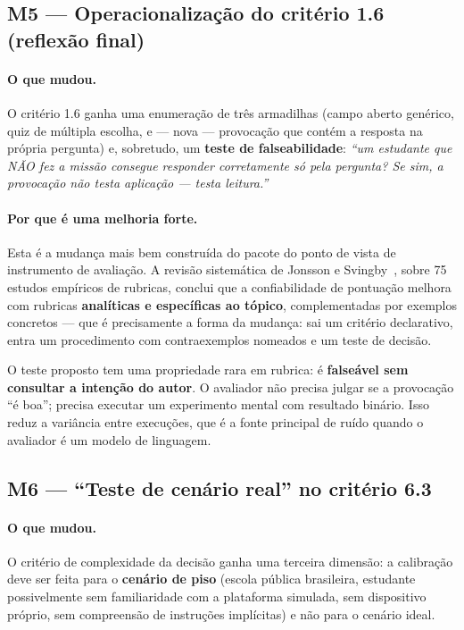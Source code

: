 \documentclass[11pt,a4paper]{article}
\begin{document}
\subsection{M5 --- Operacionalização do critério 1.6 (reflexão final)}
\label{sec:m5}

\paragraph{O que mudou.} O critério 1.6 ganha uma enumeração de três armadilhas (campo aberto genérico,
quiz de múltipla escolha, e --- nova --- provocação que contém a resposta na própria pergunta) e, sobretudo,
um \textbf{teste de falseabilidade}: \textit{``um estudante que NÃO fez a missão consegue responder
corretamente só pela pergunta? Se sim, a provocação não testa aplicação --- testa leitura.''}

\paragraph{Por que é uma melhoria forte.} Esta é a mudança mais bem construída do pacote do ponto de vista
de instrumento de avaliação. A revisão sistemática de Jonsson e Svingby~\cite{jonsson2007}, sobre 75 estudos
empíricos de rubricas, conclui que a confiabilidade de pontuação melhora com rubricas \textbf{analíticas e
específicas ao tópico}, complementadas por exemplos concretos --- que é precisamente a forma da mudança:
sai um critério declarativo, entra um procedimento com contraexemplos nomeados e um teste de decisão.

O teste proposto tem uma propriedade rara em rubrica: é \textbf{falseável sem consultar a intenção do autor}.
O avaliador não precisa julgar se a provocação ``é boa''; precisa executar um experimento mental com
resultado binário. Isso reduz a variância entre execuções, que é a fonte principal de ruído quando o
avaliador é um modelo de linguagem.

\subsection{M6 --- ``Teste de cenário real'' no critério 6.3}

\paragraph{O que mudou.} O critério de complexidade da decisão ganha uma terceira dimensão: a calibração
deve ser feita para o \textbf{cenário de piso} (escola pública brasileira, estudante possivelmente sem
familiaridade com a plataforma simulada, sem dispositivo próprio, sem compreensão de instruções implícitas)
e não para o cenário ideal.
\end{document}
